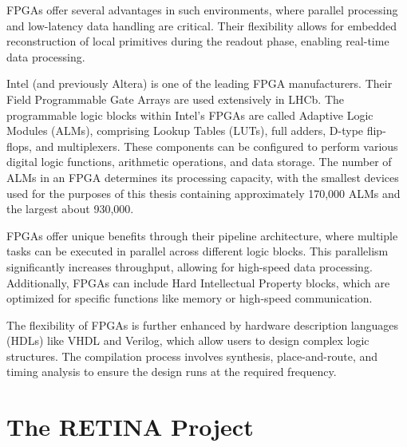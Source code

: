 FPGAs offer several advantages in such environments, where parallel processing and low-latency data handling are critical. Their flexibility allows for embedded reconstruction of local primitives during the readout phase, enabling real-time data processing.

Intel (and previously Altera) is one of the leading FPGA manufacturers. Their Field Programmable Gate Arrays are used extensively in LHCb. The programmable logic blocks within Intel's FPGAs are called Adaptive Logic Modules (ALMs), comprising Lookup Tables (LUTs), full adders, D-type flip-flops, and multiplexers. These components can be configured to perform various digital logic functions, arithmetic operations, and data storage. The number of ALMs in an FPGA determines its processing capacity, with the smallest devices used for the purposes of this thesis containing approximately 170,000 ALMs and the largest about 930,000.

FPGAs offer unique benefits through their pipeline architecture, where multiple tasks can be executed in parallel across different logic blocks. This parallelism significantly increases throughput, allowing for high-speed data processing. Additionally, FPGAs can include Hard Intellectual Property blocks, which are optimized for specific functions like memory or high-speed communication.

The flexibility of FPGAs is further enhanced by hardware description languages (HDLs) like VHDL and Verilog, which allow users to design complex logic structures. The compilation process involves synthesis, place-and-route, and timing analysis to ensure the design runs at the required frequency.

\section{The RETINA Project}

